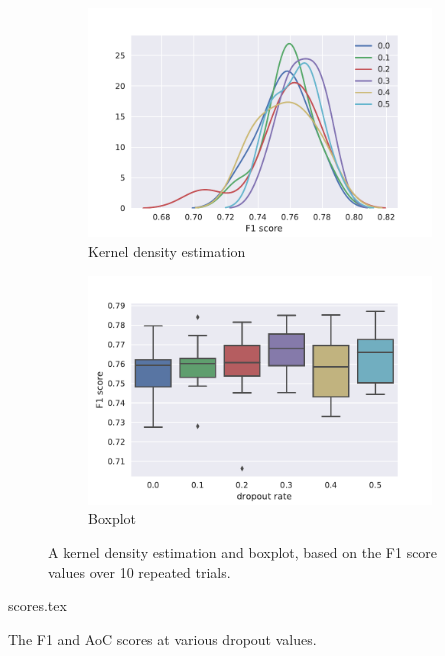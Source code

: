 \begin{figure}[tb]
  \centering
  \begin{subfigure}[t]{0.49\textwidth}
    \centering
    \includegraphics[width=\textwidth]{./figures/results/dropout/kde_f1.pdf}
    \caption{Kernel density estimation}%
    \label{fig:dropout_kde}
  \end{subfigure}
  \begin{subfigure}[t]{0.49\textwidth}
    \centering
    \includegraphics[width=\textwidth]{./figures/results/dropout/boxplot_f1.pdf}
    \caption{Boxplot}%
    \label{fig:dropout_box}
  \end{subfigure}
  \caption{A kernel density estimation and boxplot, based on the F1 score values
  over 10 repeated trials.}%
  \label{fig:dropout_dists}
\end{figure}

\begin{table}[tb]
  \centering
  {scores.tex}
  \caption{The F1 and AoC scores at various dropout values.}%
  \label{tbl:dropout}
\end{table}

